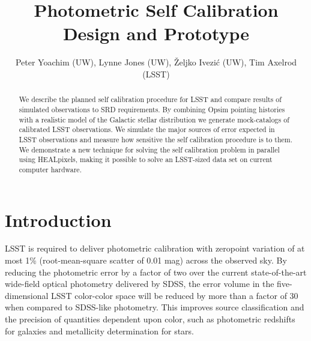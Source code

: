 \documentclass[12pt,preprint]{aastex}
\begin{document}
\title{Photometric Self Calibration Design and Prototype}
\author{Peter Yoachim (UW), Lynne Jones (UW),
\v{Z}eljko Ivezi\'{c} (UW), Tim Axelrod (LSST)}

\begin{abstract}
We describe the planned self calibration procedure for LSST and compare results of simulated observations to SRD requirements.  By combining Opsim pointing histories with a realistic model of the Galactic stellar distribution we generate mock-catalogs of calibrated LSST observations.  We simulate the major sources of error expected in LSST observations and measure how sensitive the self calibration procedure is to them.  We demonstrate a new technique for solving the self calibration problem in parallel using HEALpixels, making it possible to solve an LSST-sized data set on current computer hardware.
\end{abstract}


\section{Introduction}


LSST is required to deliver photometric calibration with zeropoint
variation of at most 1\% (root-mean-square scatter of 0.01 mag) across
the observed sky.  By reducing the photometric error by a factor of
two over the current state-of-the-art wide-field optical photometry
delivered by SDSS, the error volume in the five-dimensional LSST
color-color space will be reduced by more than a factor of 30 when
compared to SDSS-like photometry. This improves source classification
and the precision of quantities dependent upon color, such as
photometric redshifts for galaxies and metallicity determination for
stars.
\end{document}

